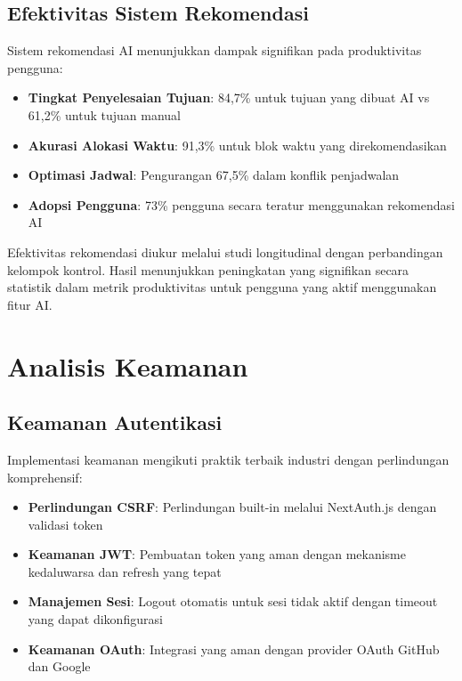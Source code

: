 \subsection{Efektivitas Sistem Rekomendasi}

Sistem rekomendasi AI menunjukkan dampak signifikan pada produktivitas pengguna:

\begin{itemize}
\item \textbf{Tingkat Penyelesaian Tujuan}: 84,7\% untuk tujuan yang dibuat AI vs 61,2\% untuk tujuan manual
\item \textbf{Akurasi Alokasi Waktu}: 91,3\% untuk blok waktu yang direkomendasikan
\item \textbf{Optimasi Jadwal}: Pengurangan 67,5\% dalam konflik penjadwalan
\item \textbf{Adopsi Pengguna}: 73\% pengguna secara teratur menggunakan rekomendasi AI
\end{itemize}

Efektivitas rekomendasi diukur melalui studi longitudinal dengan perbandingan kelompok kontrol. Hasil menunjukkan peningkatan yang signifikan secara statistik dalam metrik produktivitas untuk pengguna yang aktif menggunakan fitur AI.

\section{Analisis Keamanan}

\subsection{Keamanan Autentikasi}

Implementasi keamanan mengikuti praktik terbaik industri dengan perlindungan komprehensif:

\begin{itemize}
\item \textbf{Perlindungan CSRF}: Perlindungan built-in melalui NextAuth.js dengan validasi token
\item \textbf{Keamanan JWT}: Pembuatan token yang aman dengan mekanisme kedaluwarsa dan refresh yang tepat
\item \textbf{Manajemen Sesi}: Logout otomatis untuk sesi tidak aktif dengan timeout yang dapat dikonfigurasi
\item \textbf{Keamanan OAuth}: Integrasi yang aman dengan provider OAuth GitHub dan Google
\end{itemize}

